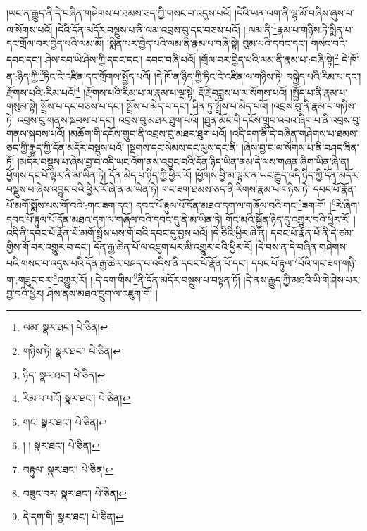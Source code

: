 །ཡང་ན་རྒྱུད་ནི་དེ་བཞིན་གཤེགས་པ་ཐམས་ཅད་ཀྱི་གསང་བ་འདུས་པའོ། །དེའི་ཡན་ལག་ནི་ལྷ་མོ་བཞིས་ཞུས་པ་ལ་སོགས་པའོ། །དེའི་དོན་མདོར་བསྡུས་པ་ནི་ལམ་འབྲས་བུ་དང་བཅས་པའོ། །:ལམ་ནི་\footnote{ལམ་  སྣར་ཐང་།  པེ་ཅིན། }རྣམ་པ་གཉིས་ཏེ་སྨིན་པ་དང་གྲོལ་བར་བྱེད་པའི་ལམ་མོ། །སྨིན་པར་བྱེད་པའི་ལམ་ནི་རྣམ་པ་བཞི་སྟེ། བུམ་པའི་དབང་དང་། གསང་བའི་དབང་དང་། ཤེས་རབ་ཡེ་ཤེས་ཀྱི་དབང་དང་། དབང་བཞི་པའོ། །གྲོལ་བར་བྱེད་པའི་ལམ་ནི་རྣམ་པ་:བཞི་སྟེ།\footnote{གཉིས་ཏེ།  སྣར་ཐང་།  པེ་ཅིན། } དེ་ཁོ་ན་:ཉིད་ཀྱི་\footnote{ཉིད་  སྣར་ཐང་།  པེ་ཅིན། }ཏིང་ངེ་འཛིན་དང་གྲོགས་སྤྱོད་པའོ། །དེ་ཁོ་ན་ཉིད་ཀྱི་ཏིང་ངེ་འཛིན་ལ་གཉིས་ཏེ། བསྐྱེད་པའི་རིམ་པ་དང་། རྫོགས་པའི་:རིམ་པའོ།\footnote{རིམ་པ་པའོ།  སྣར་ཐང་།  པེ་ཅིན། } །རྫོགས་པའི་རིམ་པ་ལ་རྣམ་པ་ལྔ་སྟེ། རྡོ་རྗེ་བཟླས་པ་ལ་སོགས་པའོ། །སྤྱོད་པ་ནི་རྣམ་པ་གསུམ་སྟེ། སྤྲོས་པ་དང་བཅས་པ་དང་། སྤྲོས་པ་མེད་པ་དང་། ཤིན་ཏུ་སྤྲོས་པ་མེད་པའོ། །འབྲས་བུ་ནི་རྣམ་པ་གཉིས་ཏེ། འབྲས་བུ་གནས་སྐབས་པ་དང་། འབྲས་བུ་མཐར་ཐུག་པའོ། །ཐུན་མོང་གི་དངོས་གྲུབ་འབའ་ཞིག་པ་ནི་འབྲས་བུ་གནས་སྐབས་པའོ། །མཆོག་གི་དངོས་གྲུབ་ནི་འབྲས་བུ་མཐར་ཐུག་པའོ། །འདི་དག་ནི་དེ་བཞིན་གཤེགས་པ་ཐམས་ཅད་ཀྱི་རྒྱུད་ཀྱི་དོན་མདོར་བསྡུས་པའོ། །སྔགས་དང་སེམས་དང་ལུས་དང་ནི། །ཞེས་བྱ་བ་ལ་སོགས་པ་ནི་བཤད་ཟིན་ཏོ། །མདོར་བསྡུས་པ་ཞེས་བྱ་བ་འདི་ཡང་འོག་ནས་འབྱུང་བའི་དོན་ཉིད་ཡིན་ནམ་དེ་ལས་གཞན་ཞིག་ཡིན་ཞེ་ན། ཕྱོགས་དང་པོ་ལྟར་ནི་མ་ཡིན་ཏེ། དོན་མེད་པ་ཉིད་ཀྱི་ཕྱིར་རོ། །ཕྱོགས་ཕྱི་མ་ལྟར་ན་ཡང་རྒྱུད་འདི་ཉིད་ཀྱི་དོན་མདོར་བསྡུས་པ་ཞེས་འབྱུང་བའི་ཕྱིར་རོ་ཞེ་ན་མ་ཡིན་ཏེ། གང་ཟག་ཐམས་ཅད་ནི་རིགས་རྣམ་པ་གཉིས་ཏེ། དབང་པོ་རྣོན་པོ་མགོ་སྨོས་པས་གོ་བའི་:གང་ཟག་དང་། དབང་པོ་རྟུལ་པོ་དོན་མཐའ་དག་ལ་གཞོལ་བའི་གང་\footnote{གང་  སྣར་ཐང་།  པེ་ཅིན། }ཟག་གོ། །\footnote{། །   སྣར་ཐང་།  པེ་ཅིན། }རེ་ཞིག་དབང་པོ་རྟུལ་པོ་དོན་མཐའ་དག་ལ་གཞོལ་བའི་དབང་དུ་ནི་མ་ཡིན་ཏེ། གོང་མའི་སྐྱོན་ཉིད་དུ་འགྱུར་བའི་ཕྱིར་རོ། །འདི་ནི་དབང་པོ་རྣོན་པོ་མགོ་སྨོས་པས་གོ་བའི་དབང་དུ་བྱས་པའོ། །དེ་ཅིའི་ཕྱིར་ཞེ་ན། དབང་པོ་རྣོན་པོ་ནི་དེ་ཙམ་གྱིས་གོ་བར་འགྱུར་བ་དང་། དོན་རྒྱ་ཆེན་པོ་ལ་འཇུག་པར་མི་འགྱུར་བའི་ཕྱིར་རོ། །དེ་བས་ན་དེ་བཞིན་གཤེགས་པའི་གསང་བ་འདུས་པའི་དོན་རྒྱ་ཆེར་བཤད་པ་འདིས་ནི་དབང་པོ་རྣོན་པོ་དང་། དབང་པོ་རྟུལ་\footnote{བརྟུལ་  སྣར་ཐང་།  པེ་ཅིན། }པོའི་གང་ཟག་གཉི་ག་:གཟུང་བར་\footnote{བཟུང་བར་  སྣར་ཐང་།  པེ་ཅིན། }འགྱུར་རོ། །:དེ་དག་གིས་\footnote{དེ་དག་གི་  སྣར་ཐང་།  པེ་ཅིན། }ནི་དོན་མདོར་བསྡུས་པ་བསྟན་ཏོ། །དེ་ནས་རྒྱུད་ཀྱི་མཐའི་ཡི་གེ་ཤེས་པར་བྱ་བའི་ཕྱིར། ཤེས་ནས་མཐའ་དྲུག་ལ་འཇུག་གོ། །
